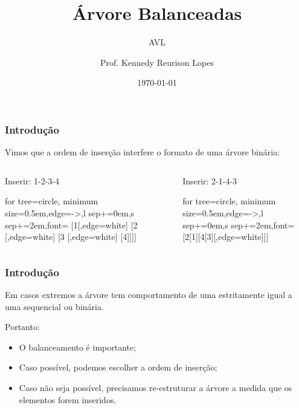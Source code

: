 \documentclass[12pt]{beamer}
\title{Árvore Balanceadas}
\subtitle{AVL}
\author{Prof. Kennedy Reurison Lopes}
\date{\today}
\begin{document}
\frame{\titlepage}

\newcommand{\floresta}[1]{
    \begin{center}
        \begin{forest}
            for tree={circle, minimum size=0.5em,edge={->},l sep+=0em,s sep+=2em,font=\small}
            #1
        \end{forest}
    \end{center}
}
\begin{frame}[t]
    \frametitle{Introdução}

    Vimos que a ordem de inserção interfere o formato de uma árvore binária:
    \vfill
    \begin{columns}[T]
        \begin{column}{0.45\textwidth}
            Inserir: 1-2-3-4\vfill
            \floresta{[1[,edge=white]
                            [2
                                    [,edge=white]
                                    [3
                                            [,edge=white]
                                            [4]]]]}
        \end{column}\hfill
        \begin{column}{0.45\textwidth}
            Inserir: 2-1-4-3\vfill
            \floresta{[2[1][4[3][,edge=white]]]}
        \end{column}
    \end{columns}

\end{frame}

\begin{frame}[t]
    \frametitle{Introdução}

    Em casos extremos a árvore tem comportamento de uma estritamente igual a uma sequencial ou binária.

    Portanto:
    \begin{itemize}
        \item O balanceamento é importante;
        \item Caso possível, podemos escolher a ordem de inserção;
        \item Caso não seja possível, precisamos re-estruturar a árvore a medida que os elementos forem inseridos.
    \end{itemize}

\end{frame}
\end{document}
